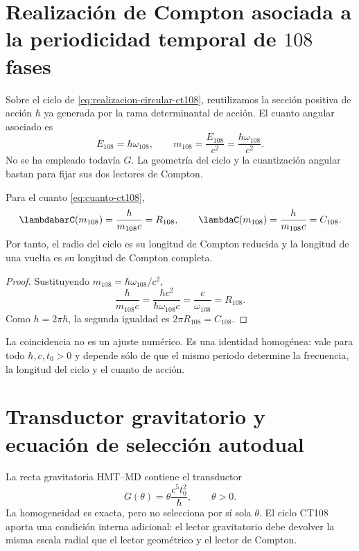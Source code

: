 \label{chap:planck-autodual}

\section{Realización de Compton asociada a la periodicidad temporal de \(108\) fases}

Sobre el ciclo de \cref{eq:realizacion-circular-ct108}, reutilizamos la sección
positiva de acción \(\hbar\) ya generada por la rama determinantal de acción.
El cuanto angular asociado es
\begin{equation}
E_{108}=\hbar\omega_{108},
\qquad
m_{108}=\frac{E_{108}}{c^2}
=\frac{\hbar\omega_{108}}{c^2}.
\label{eq:cuanto-ct108}
\end{equation}
No se ha empleado todavía \(G\). La geometría del ciclo y la cuantización
angular bastan para fijar sus dos lectores de Compton.

\begin{theorem}
\label{thm:ct108-compton}
Para el cuanto \eqref{eq:cuanto-ct108},
\begin{equation}
\lambdabarC(m_{108})=\frac{\hbar}{m_{108}c}=R_{108},
\qquad
\lambdaC(m_{108})=\frac{h}{m_{108}c}=C_{108}.
\label{eq:identidad-ct108-compton}
\end{equation}
Por tanto, el radio del ciclo es su longitud de Compton reducida y la
longitud de una vuelta es su longitud de Compton completa.
\end{theorem}

\begin{proof}
Sustituyendo \(m_{108}=\hbar\omega_{108}/c^2\),
\[
\frac{\hbar}{m_{108}c}
=\frac{\hbar c^2}{\hbar\omega_{108}c}
=\frac{c}{\omega_{108}}=R_{108}.
\]
Como \(h=2\pi\hbar\), la segunda igualdad es \(2\pi R_{108}=C_{108}\).
\end{proof}

La coincidencia no es un ajuste numérico. Es una identidad homogénea: vale
para todo \(\hbar,c,t_0>0\) y depende sólo de que el mismo periodo determine
la frecuencia, la longitud del ciclo y el cuanto de acción.

\section{Transductor gravitatorio y ecuación de selección autodual}

La recta gravitatoria HMT--MD contiene el transductor
\begin{equation}
G(\theta)=\theta\frac{c^5t_0^2}{\hbar},
\qquad \theta>0.
\label{eq:transductor-g-planck-anexo}
\end{equation}
La homogeneidad es exacta, pero no selecciona por sí sola \(\theta\). El
ciclo CT108 aporta una condición interna adicional: el lector gravitatorio
debe devolver la misma escala radial que el lector geométrico y el lector de
Compton.

